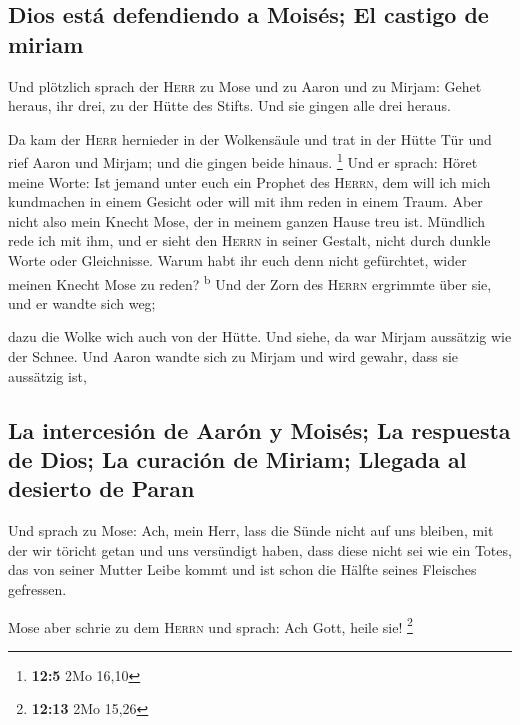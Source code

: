 \hypertarget{dios-estuxe1-defendiendo-a-moisuxe9s-el-castigo-de-miriam}{%
\subsection{Dios está defendiendo a Moisés; El castigo de
miriam}\label{dios-estuxe1-defendiendo-a-moisuxe9s-el-castigo-de-miriam}}

 Und plötzlich sprach der \textsc{Herr} zu Mose und zu
Aaron und zu Mirjam: Gehet heraus, ihr drei, zu der Hütte des Stifts.
Und sie gingen alle drei heraus.

 Da kam der \textsc{Herr} hernieder in der Wolkensäule und
trat in der Hütte Tür und rief Aaron und Mirjam; und die gingen beide
hinaus. \footnote{\textbf{12:5} 2Mo 16,10}  Und er sprach:
Höret meine Worte: Ist jemand unter euch ein Prophet des \textsc{Herrn},
dem will ich mich kundmachen in einem Gesicht oder will mit ihm reden in
einem Traum.  Aber nicht also mein Knecht Mose, der in
meinem ganzen Hause treu ist.  Mündlich rede ich mit ihm,
und er sieht den \textsc{Herrn} in seiner Gestalt, nicht durch dunkle
Worte oder Gleichnisse. Warum habt ihr euch denn nicht gefürchtet, wider
meinen Knecht Mose zu reden? \textsuperscript{b}  Und der
Zorn des \textsc{Herrn} ergrimmte über sie, und er wandte sich weg;

 dazu die Wolke wich auch von der Hütte. Und siehe, da
war Mirjam aussätzig wie der Schnee. Und Aaron wandte sich zu Mirjam und
wird gewahr, dass sie aussätzig ist,

\hypertarget{la-intercesiuxf3n-de-aaruxf3n-y-moisuxe9s-la-respuesta-de-dios-la-curaciuxf3n-de-miriam-llegada-al-desierto-de-paran}{%
\subsection{La intercesión de Aarón y Moisés; La respuesta de Dios; La
curación de Miriam; Llegada al desierto de
Paran}\label{la-intercesiuxf3n-de-aaruxf3n-y-moisuxe9s-la-respuesta-de-dios-la-curaciuxf3n-de-miriam-llegada-al-desierto-de-paran}}

 Und sprach zu Mose: Ach, mein Herr, lass die Sünde nicht
auf uns bleiben, mit der wir töricht getan und uns versündigt haben,
 dass diese nicht sei wie ein Totes, das von seiner
Mutter Leibe kommt und ist schon die Hälfte seines Fleisches gefressen.

 Mose aber schrie zu dem \textsc{Herrn} und sprach: Ach
Gott, heile sie! \footnote{\textbf{12:13} 2Mo 15,26}

